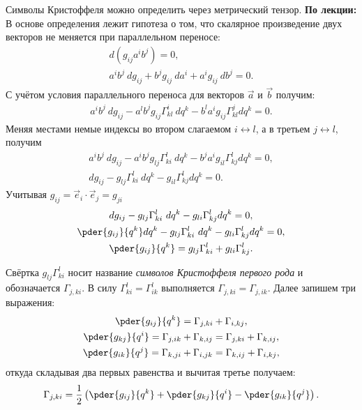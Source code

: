 Символы Кристоффеля можно определить через метрический тензор.
\textbf{По лекции:} В основе определения лежит гипотеза о том, что скалярное
произведение двух векторов не меняется при параллельном переносе:
\begin{gather*}
    d(g_{ij}a^i b^j) = 0, \\
    a^i b^j \ dg_{ij}   + b^j g_{ij}\ da^i + a^i g_{ij}\ db^j = 0.
\end{gather*}
С учётом условия параллельного переноса для векторов \( \vec{a} \) и
\( \vec{b} \) получим:
\begin{gather*}
    a^i b^j \ dg_{ij}   - 
    a^l b^j g_{ij} \Gamma^i_{kl}\ dq^k -
    b^l a^i g_{ij} \Gamma^j_{kl} dq^k = 0.
\end{gather*}
Меняя местами немые индексы во втором слагаемом \( i \leftrightarrow l \),
а в третьем \( j \leftrightarrow l \), получим
\begin{gather*}
    a^i b^j \ dg_{ij}   - 
    a^i b^j g_{lj} \Gamma^l_{ki}\ dq^k -
    b^j a^i g_{il} \Gamma^l_{kj} dq^k = 0, \\
    dg_{ij} - 
    g_{lj} \Gamma^l_{ki}\ dq^k -
    g_{il} \Gamma^l_{kj} dq^k = 0.
\end{gather*}   
Учитывая \( g_{ij} = \vec{e}_{i} \cdot \vec{e}_{j} = g_{ji} \)
\begin{gather*}
    dg_{ij} - 
    g_{lj} \Gamma^l_{ki}\ dq^k -
    g_{li} \Gamma^l_{kj} dq^k = 0, \\
    \pder{g_{ij}}{q^k} dq^k - 
    g_{lj} \Gamma^l_{ki}\ dq^k -
    g_{li} \Gamma^l_{kj} dq^k = 0, \\
    \pder{g_{ij}}{q^k} =
    g_{lj} \Gamma^l_{ki} +
    g_{li} \Gamma^l_{kj}.
\end{gather*}
    
Свёртка \( g_{lj} \Gamma^l_{ki}  \) носит название \emph{символов Кристоффеля
первого рода} и обозначается \( \Gamma_{j,ki} \). В силу
\( \Gamma^l_{ki} = \Gamma^l_{ik} \) выполняется
\( \Gamma_{j,ki} = \Gamma_{j,ik} \). Далее запишем три выражения:
\begin{gather*}
    \pder{g_{ij}}{q^k} =
    \Gamma_{j,ki} +
    \Gamma_{i,kj}, \\
    \pder{g_{kj}}{q^i} =
    \Gamma_{j,ik} +
    \Gamma_{k,ij} =
    \Gamma_{j,ki} +
    \Gamma_{k,ij},
    \\
    \pder{g_{ik}}{q^j} =
    \Gamma_{k,ji} +
    \Gamma_{i,jk} =
    \Gamma_{k,ij} +
    \Gamma_{i,kj},
\end{gather*}   
откуда складывая два первых равенства и вычитая третье получаем:
\[
    \Gamma_{j,ki} = \frac{1}{2}\left(
    \pder{g_{ij}}{q^k}+
    \pder{g_{kj}}{q^i}-
    \pder{g_{ik}}{q^j}   
    \right).
\]
    
